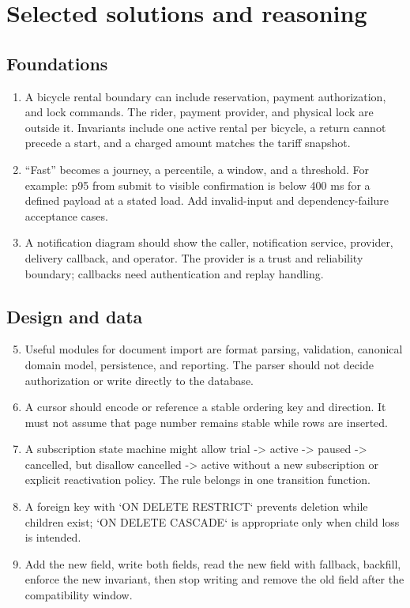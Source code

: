 \chapter{Selected solutions and reasoning}

\section{Foundations}
\begin{enumerate}
  \item A bicycle rental boundary can include reservation, payment authorization,
        and lock commands. The rider, payment provider, and physical lock are
        outside it. Invariants include one active rental per bicycle, a return
        cannot precede a start, and a charged amount matches the tariff snapshot.
  \item “Fast” becomes a journey, a percentile, a window, and a threshold. For
        example: p95 from submit to visible confirmation is below 400 ms for a
        defined payload at a stated load. Add invalid-input and dependency-failure
        acceptance cases.
  \item A notification diagram should show the caller, notification service,
        provider, delivery callback, and operator. The provider is a trust and
        reliability boundary; callbacks need authentication and replay handling.
\end{enumerate}

\section{Design and data}
\begin{enumerate}
  \setcounter{enumi}{4}
  \item Useful modules for document import are format parsing, validation,
        canonical domain model, persistence, and reporting. The parser should not
        decide authorization or write directly to the database.
  \item A cursor should encode or reference a stable ordering key and direction.
        It must not assume that page number remains stable while rows are inserted.
  \item A subscription state machine might allow trial -> active -> paused ->
        cancelled, but disallow cancelled -> active without a new subscription or
        explicit reactivation policy. The rule belongs in one transition function.
  \item A foreign key with `ON DELETE RESTRICT` prevents deletion while children
        exist; `ON DELETE CASCADE` is appropriate only when child loss is intended.
  \item Add the new field, write both fields, read the new field with fallback,
        backfill, enforce the new invariant, then stop writing and remove the old
        field after the compatibility window.
\end{enumerate}

